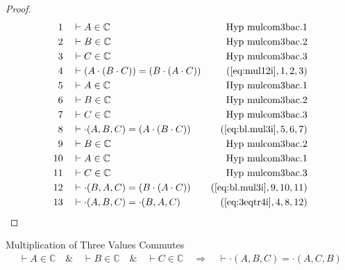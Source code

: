 \begin{proof}
\begin{align}
  1 &&  & \vdash A \in \mathbb{C}&\text{Hyp~mulcom3bac.1}\notag%
  \\ 2 &&  & \vdash B \in
\mathbb{C}&\text{Hyp~mulcom3bac.2}\notag%
  \\ 3 &&  & \vdash C \in
\mathbb{C}&\text{Hyp~mulcom3bac.3}\notag%
  \\ 4 &&  & \vdash ( A \cdot ( B \cdot C ) ) = ( B \cdot ( A \cdot C )
     )&(\mbox{\ref{eq:mul12i}},1,2,3)\notag
  \\ 5 &&  & \vdash A \in
\mathbb{C}&\text{Hyp~mulcom3bac.1}\notag%
  \\ 6 &&  & \vdash B \in
\mathbb{C}&\text{Hyp~mulcom3bac.2}\notag%
  \\ 7 &&  & \vdash C \in
\mathbb{C}&\text{Hyp~mulcom3bac.3}\notag%
  \\ 8 &&  & \vdash \cdot( A , B , C ) = ( A \cdot ( B \cdot C )
     )&(\mbox{\ref{eq:bl.mul3i}},5,6,7)\notag
  \\ 9 &&  & \vdash B \in
\mathbb{C}&\text{Hyp~mulcom3bac.2}\notag%
  \\ 10 &&  & \vdash A \in
\mathbb{C}&\text{Hyp~mulcom3bac.1}\notag%
  \\ 11 &&  & \vdash C \in
\mathbb{C}&\text{Hyp~mulcom3bac.3}\notag%
  \\ 12 &&  & \vdash \cdot( B , A , C ) = ( B \cdot ( A \cdot C )
     )&(\mbox{\ref{eq:bl.mul3i}},9,10,11)\notag
  \\ 13 &&  & \vdash \cdot( A , B , C ) = \cdot( B , A , C
     )&(\mbox{\ref{eq:3eqtr4i}},4,8,12)\notag
\end{align}
\end{proof}

\begin{lemma} {Multiplication of Three Values
Commutes}
\begin{align}
\vdash A \in \mathbb{C}\quad\&\quad \vdash B \in \mathbb{C}\quad\&\quad \vdash
    C \in \mathbb{C}\quad\Rightarrow\quad \vdash \cdot( A , B , C ) = \cdot( A
    , C , B )\label{eq:bl.mulcom3acb}\tag{bl.mulcom3acb}
\end{align}
\end{lemma}



